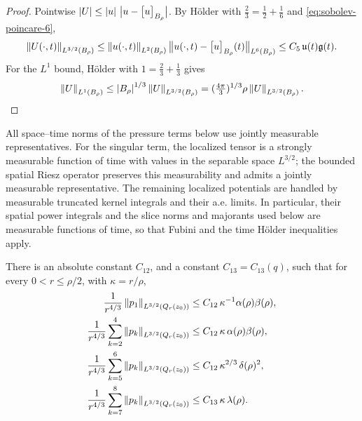 \documentclass[11pt,reqno]{amsart}
\begin{document}
\begin{proof}
Pointwise $\left\lvert U \right\rvert\le\left\lvert u \right\rvert\,\bigl|u-\bigl[u\bigr]_{B_{\rho}}\bigr|$. By H\"older
with $\tfrac23=\tfrac12+\tfrac16$ and \eqref{eq:sobolev-poincare-6},
\[
  \left\lVert U(\cdot,t) \right\rVert_{L^{3/2}(B_{\rho})}
  \le\left\lVert u(\cdot,t) \right\rVert_{L^{2}(B_{\rho})}
     \bigl\|u(\cdot,t)-\bigl[u\bigr]_{B_{\rho}}(t)\bigr\|_{L^{6}(B_{\rho})}
  \le C_{5}\,\mathfrak{u}(t)\mathfrak{g}(t).
\]
For the $L^{1}$ bound, H\"older with $1=\tfrac23+\tfrac13$ gives
\[
\left\lVert U \right\rVert_{L^{1}(B_{\rho})}\le\left\lvert B_{\rho} \right\rvert^{1/3}\left\lVert U \right\rVert_{L^{3/2}(B_{\rho})}
 =(\tfrac{4\pi}{3})^{1/3}\rho\left\lVert U \right\rVert_{L^{3/2}(B_{\rho})}
.
\]
\end{proof}

All space--time norms of the pressure terms below use jointly measurable
representatives. For the singular term, the localized tensor is a strongly
measurable function of time with values in the separable space $L^{3/2}$;
the bounded spatial Riesz operator preserves this measurability and admits
a jointly measurable representative. The remaining localized potentials
are handled by measurable truncated kernel integrals and their a.e. limits.
In particular, their spatial power integrals and the slice norms and
majorants used below are measurable functions of time, so that Fubini and
the time H\"older inequalities apply.

\begin{lemma}\label{lem:pk-bounds}
There is an absolute constant $C_{12}$, and a constant $C_{13}=C_{13}(q)$, such
that for every $0<r\le\rho/2$, with $\kappa=r/\rho$,
\begin{align}
  \frac{1}{r^{4/3}}\left\lVert p_{1} \right\rVert_{L^{3/2}(Q_{r}(z_{0}))}
    &\le C_{12}\,\kappa^{-1}\alpha(\rho)\beta(\rho),
    \label{eq:p1-bound}\\
  \frac{1}{r^{4/3}}\sum_{k=2}^{4}\left\lVert p_{k} \right\rVert_{L^{3/2}(Q_{r}(z_{0}))}
    &\le C_{12}\,\kappa\,\alpha(\rho)\beta(\rho),
    \label{eq:p234-bound}\\
  \frac{1}{r^{4/3}}\sum_{k=5}^{6}\left\lVert p_{k} \right\rVert_{L^{3/2}(Q_{r}(z_{0}))}
    &\le C_{12}\,\kappa^{2/3}\,\delta(\rho)^{2},
    \label{eq:p56-bound}\\
  \frac{1}{r^{4/3}}\sum_{k=7}^{8}\left\lVert p_{k} \right\rVert_{L^{3/2}(Q_{r}(z_{0}))}
    &\le C_{13}\,\kappa\,\lambda(\rho).
    \label{eq:p78-bound}
\end{align}
\end{lemma}
\end{document}
